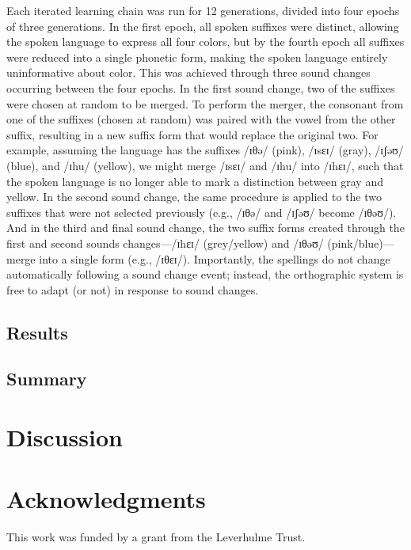 \documentclass[doc,biblatex]{apa7}
\begin{document}
Each iterated learning chain was run for 12 generations, divided into four epochs of three generations. In the first epoch, all spoken suffixes were distinct, allowing the spoken language to express all four colors, but by the fourth epoch all suffixes were reduced into a single phonetic form, making the spoken language entirely uninformative about color. This was achieved through three sound changes occurring between the four epochs. In the first sound change, two of the suffixes were chosen at random to be merged. To perform the merger, the consonant from one of the suffixes (chosen at random) was paired with the vowel from the other suffix, resulting in a new suffix form that would replace the original two. For example, assuming the language has the suffixes /ɪθə/ (pink), /ɪsɛɪ/ (gray), /ɪʃəʊ/ (blue), and /ɪhu/ (yellow), we might merge /ɪsɛɪ/ and /ɪhu/ into /ɪhɛɪ/, such that the spoken language is no longer able to mark a distinction between gray and yellow. In the second sound change, the same procedure is applied to the two suffixes that were not selected previously (e.g., /ɪθə/ and /ɪʃəʊ/ become /ɪθəʊ/). And in the third and final sound change, the two suffix forms created through the first and second sounds changes---/ɪhɛɪ/ (grey/yellow) and /ɪθəʊ/ (pink/blue)---merge into a single form (e.g., /ɪθɛɪ/). Importantly, the spellings do not change automatically following a sound change event; instead, the orthographic system is free to adapt (or not) in response to sound changes.

\subsection{Results}



\subsection{Summary}


\section{Discussion}


\section{Acknowledgments}

\noindent This work was funded by a grant from the Leverhulme Trust.

\printbibliography
\end{document}
